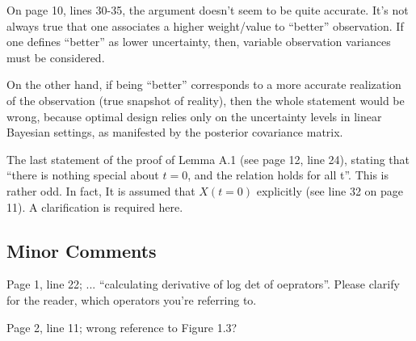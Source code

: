 \documentclass{amsart}
\begin{document}
On page 10, lines 30-35, the argument doesn't seem to be quite
accurate. It's not always true that one associates a higher
weight/value to ``better'' observation. If one defines ``better'' as
lower uncertainty, then, variable observation variances must be
considered.
%

On the other hand, if being ``better'' corresponds to a more accurate
realization of the observation (true snapshot of reality), then the
whole statement would be wrong, because optimal design relies only on
the uncertainty levels in linear Bayesian settings, as manifested by
the posterior covariance matrix.
%


The last statement of the proof of Lemma A.1 (see page 12, line 24),
stating that ``there is nothing special about $t=0$, and the relation
holds for all t''. This is rather odd. In fact, It is assumed that
$X(t=0)$ explicitly (see line 32 on page 11). A clarification is
required here.
%


\subsection{Minor Comments}

Page 1, line 22; ... ``calculating derivative of log det of
oeprators''. Please clarify for the reader, which operators you're
referring to.
%

Page 2, line 11; wrong reference to Figure 1.3?
%
\end{document}
